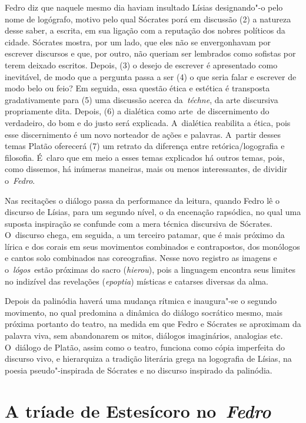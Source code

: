 Fedro diz que naquele mesmo dia haviam insultado Lísias designando"-o
pelo nome de logógrafo, motivo pelo qual Sócrates porá em discussão (2)
a natureza desse saber, a escrita, em sua ligação com a reputação dos
nobres políticos da cidade. Sócrates mostra, por um lado, que eles não
se envergonhavam por escrever discursos e que, por outro, não queriam
ser lembrados como sofistas por terem deixado escritos. Depois, (3) o
desejo de escrever é apresentado como inevitável, de modo que a pergunta
passa a ser (4) o que seria falar e escrever de modo belo ou feio? Em
seguida, essa questão ética e estética é transposta gradativamente para
(5) uma discussão acerca da~\emph{téchne}, da arte discursiva
propriamente dita. Depois, (6) a dialética como arte\emph{~}de
discernimento do verdadeiro, do bom e do justo será explicada. A~dialética reabilita a ética, pois esse discernimento é um novo norteador
de ações e palavras. A~partir desses temas Platão oferecerá (7) um
retrato da diferença entre retórica/\allowbreak{}logografia e filosofia. É~claro que
em meio a esses temas explicados há outros temas, pois, como dissemos,
há inúmeras maneiras, mais ou menos interessantes, de dividir
o~\emph{Fedro}.

Nas recitações o diálogo passa da performance da leitura, quando Fedro
lê o discurso de Lísias, para um segundo nível, o da encenação
rapsódica, no qual uma suposta inspiração se confunde com a mera técnica
discursiva de Sócrates. O~discurso chega, em seguida, a um terceiro
patamar, que é mais próximo da lírica e dos corais em seus movimentos
combinados e contrapostos, dos monólogos e cantos solo combinados nas
coreografias. Nesse novo registro as imagens e o~\emph{lógos}~estão
próximas do sacro (\emph{hierou}), pois a linguagem encontra seus
limites no indizível das revelações (\emph{epoptia}) místicas e catarses
diversas da alma.

Depois da palinódia haverá uma mudança rítmica e inaugura"-se o segundo
movimento, no qual predomina a dinâmica do diálogo socrático mesmo, mais
próxima portanto do teatro, na medida em que Fedro e Sócrates se
aproximam da palavra viva, sem abandonarem os mitos, diálogos
imaginários, analogias etc. O~diálogo de Platão, assim como o teatro,
funciona como cópia imperfeita do discurso vivo, e hierarquiza a
tradição literária grega na logografia de Lísias, na poesia
pseudo"-inspirada de Sócrates e no discurso inspirado da palinódia.

 

\section{A tríade de Estesícoro no~\emph{Fedro}}


